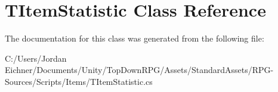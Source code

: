 \hypertarget{class_t_item_statistic}{}\section{T\+Item\+Statistic Class Reference}
\label{class_t_item_statistic}


The documentation for this class was generated from the following file\+:\begin{DoxyCompactItemize}
\item 
C\+:/\+Users/\+Jordan Eichner/\+Documents/\+Unity/\+Top\+Down\+R\+P\+G/\+Assets/\+Standard\+Assets/\+R\+P\+G-\/\+Sources/\+Scripts/\+Items/T\+Item\+Statistic.\+cs\end{DoxyCompactItemize}
